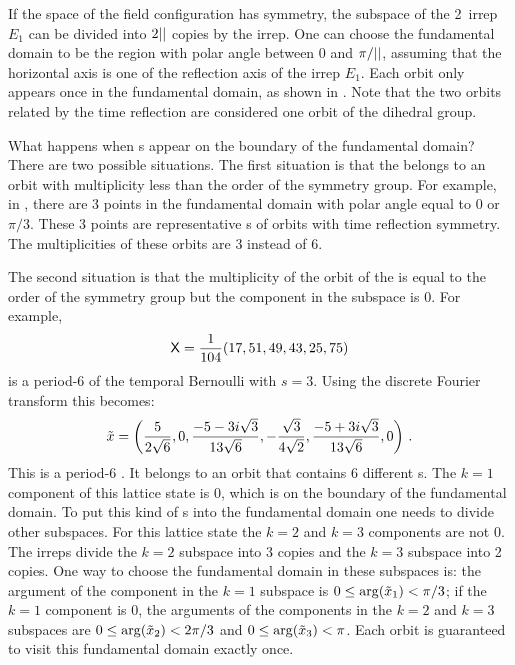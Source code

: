 If the space of the field configuration has \Dn{\cl{}} symmetry,
the subspace of the 2\dmn\ irrep $E_1$ can be divided
into $2{||}$ copies by the irrep. One can choose the fundamental domain to be the region
with polar angle between 0 and $\pi/{||}$, assuming that the horizontal axis is one of the
reflection axis of the irrep $E_1$. Each orbit only appears once in the fundamental domain,
as shown in . Note that the two orbits related by
the time reflection are considered one orbit of the dihedral group.

What happens when {\lattstate}s appear on the boundary of the fundamental domain?
There are two possible situations. The first situation is that the {\lattstate} belongs to an
orbit with multiplicity less than the order of the symmetry group. For example,
in , there are 3 points in the fundamental domain
with polar angle equal to 0 or $\pi/3$. These 3 points are representative {\lattstate}s of orbits
with time reflection symmetry. The multiplicities of these orbits are 3 instead of 6.

The second situation is that the multiplicity of
the orbit of the {\lattstate} is equal to the order of the symmetry group
but the component in the subspace is 0. For example,
\[
\mathsf{X} = \frac{1}{104} (17, 51, 49, 43, 25, 75)
\]
is a period-6 {\lattstate} of the temporal Bernoulli
 with $s=3$. Using the discrete Fourier transform
this {\lattstate} becomes:
\[
\tilde{x} =
\left(\frac{5}{2 \sqrt{6}},0,\frac{-5-3 i \sqrt{3}}{13
   \sqrt{6}},-\frac{\sqrt{3}}{4\sqrt{2}},\frac{-5+3 i \sqrt{3}}{13 \sqrt{6}},0\right) \,.
\]
This is a period-6 {\lattstate}. It belongs to an orbit that
contains 6 different {\lattstate}s. The $k=1$ component of this lattice
state is 0, which is on the boundary of the fundamental domain. To put this kind of
{\lattstate}s into the fundamental domain one needs to divide other subspaces.
For this lattice state the $k=2$ and $k=3$ components are not 0. The irreps divide
the $k=2$ subspace into 3 copies and the $k=3$ subspace into 2 copies. One way to
choose the fundamental domain in these subspaces is: the argument of the component
in the $k=1$ subspace is $0\leq\arg(\tilde{x}_{1})<\pi/3$; if the $k=1$ component
is 0, the arguments of the components
in the $k=2$ and $k=3$ subspaces are $0\leq\arg(\tilde{x}_{2})<2\pi/3{}$ and
$0\leq\arg(\tilde{x}_{3})<\pi$. Each orbit is guaranteed to visit this fundamental
domain exactly once.
